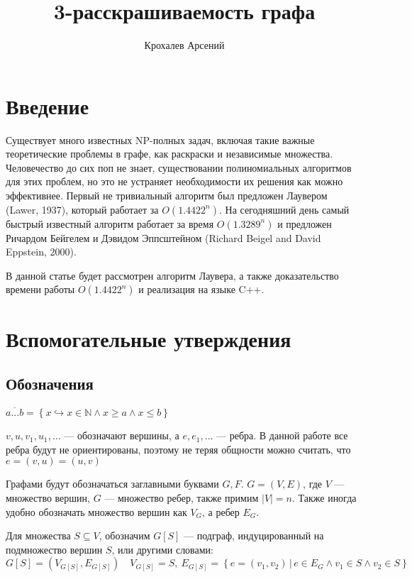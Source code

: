\documentclass[12pt]{article}
\title{3-расскрашиваемость графа}
\author{Крохалев Арсений}
\begin{document}
\maketitle

\section{Введение}
Существует много известных NP-полных задач, включая такие важные теоретические проблемы в графе, как раскраски и независимые множества. Человечество до сих поп не знает, существовании полиномиальных алгоритмов для этих проблем, но это не устраняет необходимости их решения как можно эффективнее. Первый не тривиальный алгоритм был предложен Лаувером (Lawer, 1937), который работает за $O\left(1.4422^n\right)$. На сегодняшний день самый быстрый известный алгоритм работает за время $O\left(1.3289^n\right)$ и предложен Ричардом Бейгелем и Дэвидом Эппсштейном (Richard Beigel and David Eppstein, 2000).

В данной статье будет рассмотрен алгоритм Лаувера, а также доказательство времени работы $O\left(1.4422^n\right)$ и реализация на языке $\text{C++}$.

\section{Вспомогательные утверждения}
\subsection{Обозначения}
$\overline{a...b} = \left\{x \hookrightarrow x \in \mathbb{N} \wedge x \geq a \wedge x \leq b \right\}$

$v, u, v_1, u_1, \dots$ --- обозначают вершины, а $e, e_1, \dots$ --- ребра. В данной работе все ребра будут не ориентированы, поэтому не теряя общности можно считать, что $e = \left(v, u\right) = \left(u, v\right)$

Графами будут обозначаться заглавными буквами $G, F$. $G = \left(V, E\right)$, где $V$ --- множество вершин, $G$ --- множество ребер, также примим $\left|V\right| = n$. Также иногда удобно обозначать множество вершин как $V_G$, а ребер $E_G$.

Для множества $S \subseteq V$, обозначим $G\left[S\right]$ --- подграф, индуцированный на подмножество вершин $S$, или другими словами: 
$$G\left[S\right] = \left(V_{G\left[S\right]}, E_{G\left[S\right]}\right) \quad V_{G\left[S\right]} = S, ~ E_{G\left[S\right]} = \left\{e = \left(v_1, v_2\right) \, | \, e \in E_G \wedge v_1 \in S \wedge v_2 \in S \right\}$$
\end{document}
